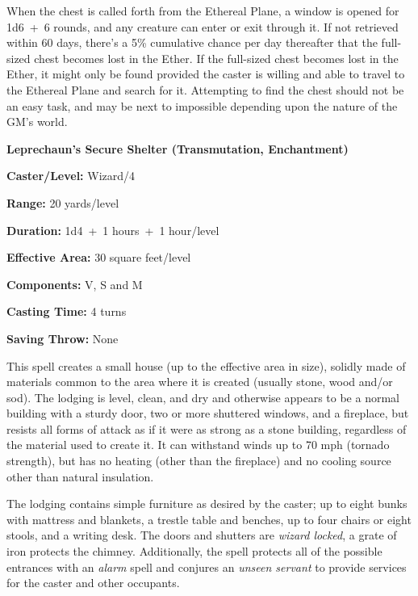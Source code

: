 \begin{multicols}{2}
When the chest is called forth from the Ethereal Plane, a window is opened for 1d6~+~6 rounds, and any creature can enter or exit through it.  If not retrieved within 60 days, there's a 5\% cumulative chance per day thereafter that the full-sized chest becomes lost in the Ether.  If the full-sized chest becomes lost in the Ether, it might only be found provided the caster is willing and able to travel to the Ethereal Plane and search for it.  Attempting to find the chest should not be an easy task, and may be next to impossible depending upon the nature of the GM's world.

\vspace{1em}

\noindent
\begin{minipage}{\columnwidth}

\noindent \textbf{Leprechaun's Secure Shelter (Transmutation, Enchantment)}

\noindent \textbf{Caster/Level:} Wizard/4

\noindent \textbf{Range:} 20 yards/level

\noindent \textbf{Duration:} 1d4~+~1 hours~+~1 hour/level

\noindent \textbf{Effective Area:} 30 square feet/level

\noindent \textbf{Components:} V, S and M

\noindent \textbf{Casting Time:} 4 turns

\noindent \textbf{Saving Throw:} None

\end{minipage}

This spell creates a small house (up to the effective area in size), solidly made of materials common to the area where it is created (usually stone, wood and/or sod).  The lodging is level, clean, and dry and otherwise appears to be a normal building with a sturdy door, two or more shuttered windows, and a fireplace, but resists all forms of attack as if it were as strong as a stone building, regardless of the material used to create it.  It can withstand winds up to 70 mph (tornado strength), but has no heating (other than the fireplace) and no cooling source other than natural insulation. 

The lodging contains simple furniture as desired by the caster; up to eight bunks with mattress and blankets, a trestle table and benches, up to four chairs or eight stools, and a writing desk.  The doors and shutters are \textit{wizard locked}, a grate of iron protects the chimney.  Additionally, the spell protects all of the possible entrances with an \textit{alarm} spell and conjures an \textit{unseen servant} to provide services for the caster and other occupants.  


\end{multicols}
